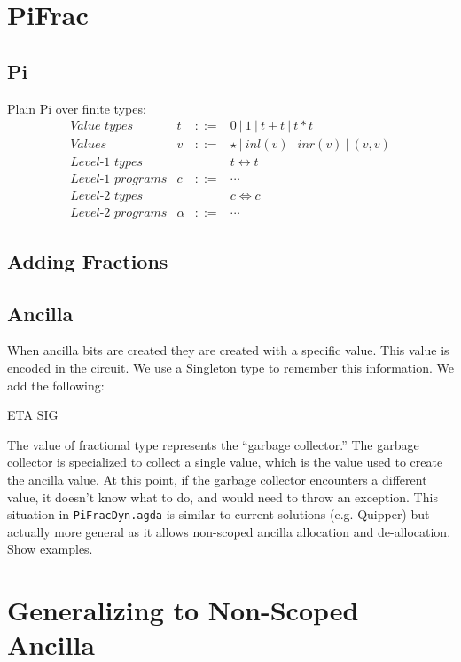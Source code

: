 \documentclass[sigplan,10pt,review,anonymous]{acmart}
\newcommand{\alt}{~|~}
\newcommand{\inlv}[1]{\ensuremath{\mathit{inl}(v)}}
\newcommand{\inrv}[1]{\ensuremath{\mathit{inr}(v)}}
\begin{document}
\section{PiFrac}

\subsection{Pi}

Plain Pi over finite types:
\[\begin{array}{lrcl}
\textit{Value types} & t &::=& 0 \alt 1 \alt t+t \alt t*t \\
\textit{Values}      & v &::=& \star \alt \inlv{v} \alt \inrv{v} \alt (v,v) \\
\textit{Level-1 types} &&& t \leftrightarrow t \\
\textit{Level-1 programs} & c &::=& \cdots \\
\textit{Level-2 types} &&& c \Leftrightarrow c \\
\textit{Level-2 programs} & \alpha &::=& \cdots 
\end{array}\]

\subsection{Adding Fractions}

\subsection{Ancilla}

When ancilla bits are created they are created with a specific
value. This value is encoded in the circuit. We use a Singleton type
to remember this information. We add the following:

ETA SIG

The value of fractional type represents the ``garbage collector.''
The garbage collector is specialized to collect a single value, which
is the value used to create the ancilla value. At this point, if the
garbage collector encounters a different value, it doesn't know what
to do, and would need to throw an exception. This situation in
\verb|PiFracDyn.agda| is similar to current solutions (e.g. Quipper)
but actually more general as it allows non-scoped ancilla allocation
and de-allocation. Show examples.

\section{Generalizing to Non-Scoped Ancilla}
\end{document}
